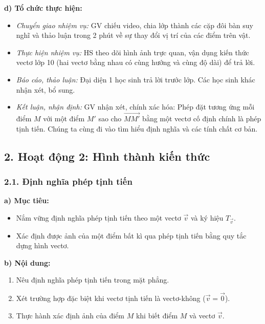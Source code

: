 \documentclass[12pt, a4paper]{article}
\renewcommand{\vec}[1]{\overrightarrow{#1}}
\begin{document}
\noindent \textbf{d) Tổ chức thực hiện:}  
\begin{itemize}[leftmargin=0.8cm]  
    \item \textit{Chuyển giao nhiệm vụ:} GV chiếu video, chia lớp thành các cặp đôi bàn suy nghĩ và thảo luận trong 2 phút về sự thay đổi vị trí của các điểm trên vật.  
    \item \textit{Thực hiện nhiệm vụ:} HS theo dõi hình ảnh trực quan, vận dụng kiến thức vectơ lớp 10 (hai vectơ bằng nhau có cùng hướng và cùng độ dài) để trả lời.  
    \item \textit{Báo cáo, thảo luận:} Đại diện 1 học sinh trả lời trước lớp. Các học sinh khác nhận xét, bổ sung.  
    \item \textit{Kết luận, nhận định:} GV nhận xét, chính xác hóa: Phép đặt tương ứng mỗi điểm $M$ với một điểm $M'$ sao cho $\vec{MM'}$ bằng một vectơ cố định chính là phép tịnh tiến. Chúng ta cùng đi vào tìm hiểu định nghĩa và các tính chất cơ bản.  
\end{itemize}  
  
\subsection*{2. Hoạt động 2: Hình thành kiến thức}  
  
\subsubsection*{2.1. Định nghĩa phép tịnh tiến}  
  
\noindent \textbf{a) Mục tiêu:}  
\begin{itemize}[leftmargin=0.8cm]  
    \item Nắm vững định nghĩa phép tịnh tiến theo một vectơ $\vec{v}$ và ký hiệu $T_{\vec{v}}$.  
    \item Xác định được ảnh của một điểm bất kì qua phép tịnh tiến bằng quy tắc dựng hình vectơ.  
\end{itemize}  
  
\noindent \textbf{b) Nội dung:}  
\begin{enumerate}[leftmargin=0.6cm]  
    \item Nêu định nghĩa phép tịnh tiến trong mặt phẳng.  
    \item Xét trường hợp đặc biệt khi vectơ tịnh tiến là vectơ-không ($\vec{v} = \vec{0}$).  
    \item Thực hành xác định ảnh của điểm $M$ khi biết điểm $M$ và vectơ $\vec{v}$.  
\end{enumerate}  
  
\end{document}

